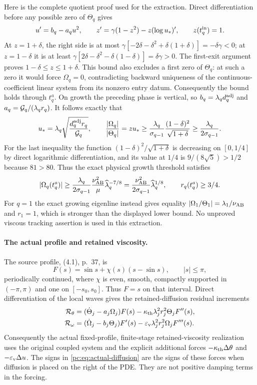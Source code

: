 Here is the complete quotient proof used for the extraction. Direct differentiation before any possible zero of $\Theta_q$ gives
\[
 u'=b_q-a_qu^2,\qquad z'=\gamma(1-z^2)-z(\log u_*)',\qquad z(t_q^{\rm in})=1.
\]
At $z=1+\delta$, the right side is at most
$\gamma[-2\delta-\delta^2+\delta(1+\delta)]=-\delta\gamma<0$;
at $z=1-\delta$ it is at least
$\gamma[2\delta-\delta^2-\delta(1-\delta)]=\delta\gamma>0$.
The first-exit argument proves $1-\delta\le z\le1+\delta$. This bound also excludes a first zero of $\Theta_q$: at such a zero it would force $\Omega_q=0$, contradicting backward uniqueness of the continuous-coefficient linear system from its nonzero entry datum. Consequently the bound holds through $t_q^a$.
On growth the preceding phase is vertical, so $b_q=\lambda_qd_q^{\rm adj}$ and $a_q=\mathcal G_q/(\lambda_qr_q)$. It follows exactly that
\[
 u_*=\lambda_q\sqrt{\frac{d_q^{\rm adj}r_q}{\mathcal G_q}},\qquad
 \frac{|\Omega_q|}{|\Theta_q|}=zu_*
 \ge\frac{\lambda_q}{\sigma_{q-1}}
 \frac{(1-\delta)^2}{\sqrt{1+\delta}}
 \ge\frac{\lambda_q}{2\sigma_{q-1}}.
\]
For the last inequality the function $(1-\delta)^2/\sqrt{1+\delta}$ is decreasing on $[0,1/4]$ by direct logarithmic differentiation, and its value at $1/4$ is $9/(8\sqrt5)>1/2$ because $81>80$. Thus the exact physical growth threshold satisfies
\begin{equation}\label{pc:eq:omega-lower}
 |\Omega_q(t_q^a)|\ge\frac{\lambda_q}{2\sigma_{q-1}}
 \frac{\nu_{\mathrm{AB}}^2}{\mu}\widehat\lambda_q^{-7/8}
 =\frac{\nu_{\mathrm{AB}}^2}{2\sigma_{q-1}}\widehat\lambda_q^{1/8},
 \qquad r_q(t_q^a)\ge3/4.
\end{equation}
For $q=1$ the exact growing eigenline instead gives equality $|\Omega_1/\Theta_1|=\lambda_1/\nu_{\mathrm{AB}}$ and $r_1=1$, which is stronger than the displayed lower bound. No unproved viscous tracking assertion is used in this extraction.

\paragraph{The actual profile and retained viscosity.}
The source profile, (4.1), p.~37, is
\[
 F(s)=\sin s+\chi(s)(s-\sin s),\qquad |s|\le\pi,
\]
periodically continued, where $\chi$ is even, smooth, compactly supported in $(-\pi,\pi)$ and one on $[-s_0,s_0]$. Thus $F=s$ on that interval. Direct differentiation of the local waves gives the retained-diffusion residual increments
\begin{align}
 \mathcal R_\theta&=(\dot\Theta_j-a_j\Omega_j)F(s)-\kappa_{\mathrm{th}}\lambda_j^2r_j^2\Theta_jF''(s),\label{pc:eq:actual-diffusion}\\
 \mathcal R_\omega&=(\dot\Omega_j-b_j\Theta_j)F'(s)-\varepsilon_{\mathrm v}\lambda_j^2r_j^2\Omega_jF'''(s).\nonumber
\end{align}
Consequently the actual fixed-profile, finite-stage retained-viscosity realization uses the original coupled system and the explicit additional forces $-\kappa_{\mathrm{th}}\Delta\theta$ and $-\varepsilon_{\mathrm v}\Delta u$. The signs in \eqref{pc:eq:actual-diffusion} are the signs of these forces when diffusion is placed on the right of the PDE. They are not positive damping terms in the forcing.

